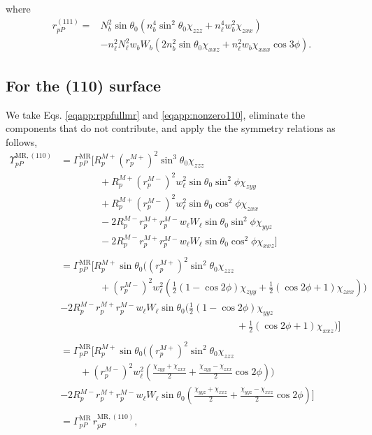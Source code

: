 where
\begin{equation}\label{eqapp:final-rpp.111}
\begin{split}
r^{(111)}_{pP} = 
&N^{2}_{b}\sin\theta_{0}(n^{4}_{b}\sin^{2}\theta_{0}\chi_{zzz} 
+ n^{4}_{\ell}w^{2}_{b}\chi_{zxx})\\
&- n^{2}_{\ell}N^{2}_{\ell}w_{b}W_{b}(2n^{2}_{b}\sin\theta_{0}\chi_{xxz}
 + n^{2}_{\ell}w_{b}\chi_{xxx}\cos3\phi).
\end{split}
\end{equation}


\subsection{For the (110) surface}

We take Eqs. \eqref{eqapp:rppfullmr} and \eqref{eqapp:nonzero110}, eliminate the
components that do not contribute, and apply the the symmetry relations as
follows,
\begin{equation*}
\begin{split}
\Upsilon^{\mathrm{MR},(110)}_{pP} &=
\Gamma^{\mathrm{MR}}_{pP}
\bigg[
R^{M+}_{p}\left(r^{M+}_{p}\right)^{2}\sin^{3}\theta_{0}\chi_{zzz}\\
&\qquad\qquad+ R^{M+}_{p}\left(r^{M-}_{p}\right)^{2}w^{2}_{\ell}
      \sin\theta_{0}\sin^{2}\phi\chi_{zyy}\\
&\qquad\qquad+ R^{M+}_{p}\left(r^{M-}_{p}\right)^{2}w^{2}_{\ell}
      \sin\theta_{0}\cos^{2}\phi\chi_{zxx}\\
&\qquad\qquad- 2R^{M-}_{p}r^{M+}_{p}r^{M-}_{p}w_{\ell}W_{\ell}
      \sin\theta_{0}\sin^{2}\phi\chi_{yyz}\\
&\qquad\qquad- 2R^{M-}_{p}r^{M+}_{p}r^{M-}_{p}w_{\ell}W_{\ell}
      \sin\theta_{0}\cos^{2}\phi\chi_{xxz}
\bigg]\\\\
&=
\Gamma^{\mathrm{MR}}_{pP}
\bigg[
R^{M+}_{p}\sin\theta_{0}
\bigg(
\left(r^{M+}_{p}\right)^{2}\sin^{2}\theta_{0}\chi_{zzz}\\
&\qquad\qquad+ \left(r^{M-}_{p}\right)^{2}w^{2}_{\ell}
\left(
\frac{1}{2}(1-\cos2\phi)\chi_{zyy} + \frac{1}{2}(\cos2\phi+1)\chi_{zxx}
\right)
\bigg)\\
&- 2R^{M-}_{p}r^{M+}_{p}r^{M-}_{p}w_{\ell}W_{\ell}\sin\theta_{0}
\bigg(
\frac{1}{2}(1-\cos2\phi)\chi_{yyz}\\
&\qquad\qquad\qquad\qquad\qquad\qquad\qquad\qquad\qquad
+ \frac{1}{2}(\cos2\phi+1)\chi_{xxz}
\bigg)
\bigg]\\\\
&=
\Gamma^{\mathrm{MR}}_{pP}
\bigg[
R^{M+}_{p}\sin\theta_{0}
\bigg(
\left(r^{M+}_{p}\right)^{2}\sin^{2}\theta_{0}\chi_{zzz}\\
&\qquad+ \left(r^{M-}_{p}\right)^{2}w^{2}_{\ell}
\left(
\frac{\chi_{zyy} + \chi_{zxx}}{2} + \frac{\chi_{zyy} - \chi_{zxx}}{2}\cos2\phi
\right)
\bigg)\\
&- 2R^{M-}_{p}r^{M+}_{p}r^{M-}_{p}w_{\ell}W_{\ell}\sin\theta_{0}
\left(
\frac{\chi_{yyz} + \chi_{xxz}}{2} + \frac{\chi_{yyz} - \chi_{xxz}}{2}\cos2\phi
\right)
\bigg]\\\\
&= \Gamma^{\mathrm{MR}}_{pP}\,r^{\mathrm{MR},(110)}_{pP},
\end{split}
\end{equation*}
